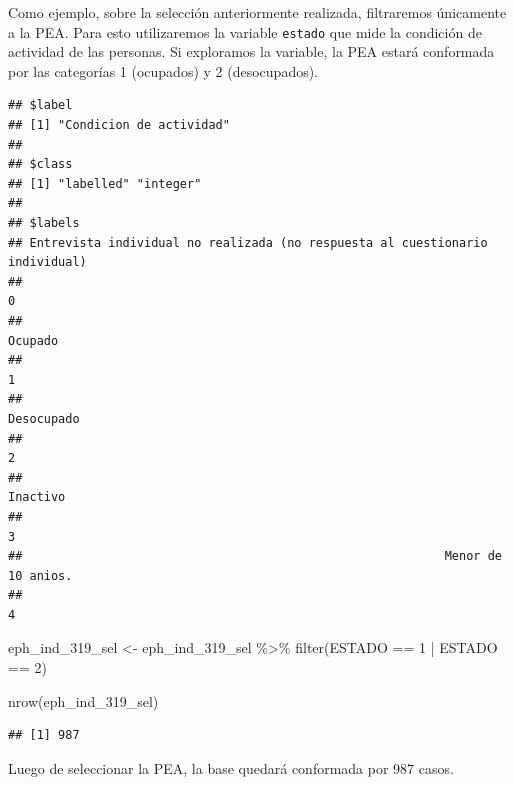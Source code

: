 \documentclass[
]{book}
\newenvironment{Shaded}{\begin{snugshade}}{\end{snugshade}}
\newcommand{\DecValTok}[1]{\textcolor[rgb]{0.00,0.00,0.81}{#1}}
\newcommand{\FunctionTok}[1]{\textcolor[rgb]{0.00,0.00,0.00}{#1}}
\newcommand{\NormalTok}[1]{#1}
\newcommand{\OtherTok}[1]{\textcolor[rgb]{0.56,0.35,0.01}{#1}}
\newcommand{\SpecialCharTok}[1]{\textcolor[rgb]{0.00,0.00,0.00}{#1}}
\begin{document}
Como ejemplo, sobre la selección anteriormente realizada, filtraremos únicamente a la PEA. Para esto utilizaremos la variable \texttt{estado} que mide la condición de actividad de las personas. Si exploramos la variable, la PEA estará conformada por las categorías 1 (ocupados) y 2 (desocupados).

\begin{Shaded}
\end{Shaded}

\begin{verbatim}
## $label
## [1] "Condicion de actividad"
## 
## $class
## [1] "labelled" "integer" 
## 
## $labels
## Entrevista individual no realizada (no respuesta al cuestionario individual) 
##                                                                            0 
##                                                                      Ocupado 
##                                                                            1 
##                                                                   Desocupado 
##                                                                            2 
##                                                                     Inactivo 
##                                                                            3 
##                                                           Menor de 10 anios. 
##                                                                            4
\end{verbatim}

\begin{Shaded}
\begin{Highlighting}[]
\NormalTok{eph\_ind\_319\_sel }\OtherTok{\textless{}{-}}\NormalTok{ eph\_ind\_319\_sel }\SpecialCharTok{\%\textgreater{}\%} 
    \FunctionTok{filter}\NormalTok{(ESTADO }\SpecialCharTok{==} \DecValTok{1} \SpecialCharTok{|}\NormalTok{ ESTADO }\SpecialCharTok{==} \DecValTok{2}\NormalTok{)}

\FunctionTok{nrow}\NormalTok{(eph\_ind\_319\_sel)}
\end{Highlighting}
\end{Shaded}

\begin{verbatim}
## [1] 987
\end{verbatim}

Luego de seleccionar la PEA, la base quedará conformada por 987 casos.
\end{document}
